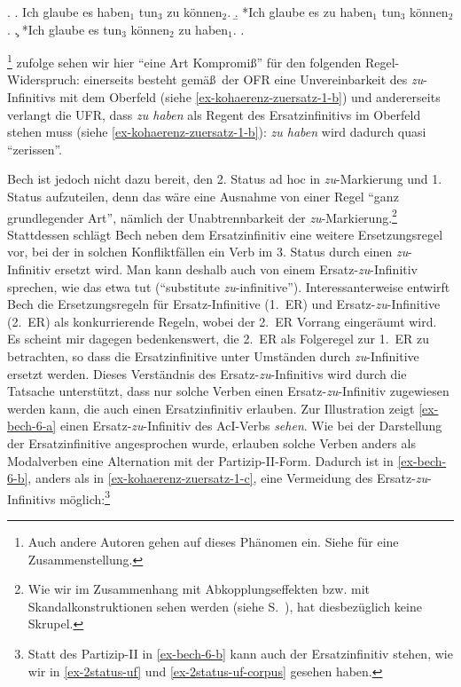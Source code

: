 \ex. 
\a. Ich glaube es haben$_1$ tun$_3$ zu können$_2$. \label{ex-kohaerenz-zuersatz-1}
\b. *Ich glaube es zu haben$_1$ tun$_3$ können$_2$. \label{ex-kohaerenz-zuersatz-1-b}
\c. *Ich glaube es tun$_3$ können$_2$ zu haben$_1$. \label{ex-kohaerenz-zuersatz-1-c}
\z. \citep[\S 14]{Bech:63}

\cite{Bech:63}\footnote{Auch andere Autoren gehen auf dieses Phänomen ein. Siehe \citet[70]{Meurers:99} für eine Zusammenstellung.} zufolge sehen wir hier "`eine Art Kompromi\ss "' für den folgenden Regel-Wider\-spruch: einerseits besteht gemä\ss\ der OFR eine Unvereinbarkeit des \emph{zu}-Infinitivs mit dem Oberfeld (siehe \ref{ex-kohaerenz-zuersatz-1-b}) und andererseits verlangt die UFR, dass {\it zu haben} als Regent des Ersatzinfinitivs im Oberfeld stehen muss (siehe \ref{ex-kohaerenz-zuersatz-1-b}): {\it zu haben} wird dadurch quasi "`zerissen"'. 

Bech ist jedoch nicht dazu bereit, den 2. Status ad hoc in {\it zu}-Markierung und 1. Status aufzuteilen, denn das wäre eine Ausnahme von einer Regel "`ganz grundlegender Art"', nämlich der Unabtrennbarkeit der {\it zu}-Markierung.\footnote{Wie wir im Zusammenhang mit Abkopplungseffekten bzw. mit Skandalkonstruktionen sehen werden (siehe S.~\pageref{sec-skandal}), hat \cite{Vogel:09} diesbezüglich keine Skrupel.} Stattdessen schlägt Bech neben dem Ersatzinfinitiv eine weitere Ersetzungsregel vor, bei der in solchen Konfliktfällen ein Verb im 3. Status durch einen \emph{zu}-Infinitiv ersetzt wird. Man kann deshalb auch von einem Ersatz-\emph{zu}-Infinitiv sprechen, wie das etwa \citet[70ff]{Meurers:99} tut ("`substitute \emph{zu}-infinitive"'). Interessanterweise entwirft Bech die Ersetzungsregeln für Ersatz-Infinitive (1.~ER) und Ersatz-\emph{zu}-Infinitive (2.~ER) als konkurrierende Regeln, wobei der 2.~ER Vorrang eingeräumt wird. Es scheint  mir dagegen bedenkenswert, die 2.~ER als Folgeregel zur 1.~ER zu betrachten, so dass die Ersatzinfinitive unter Umständen durch \emph{zu}-Infinitive ersetzt werden. Dieses Verständnis des Ersatz-\emph{zu}-Infinitivs wird durch die Tatsache unterstützt, dass nur solche Verben einen Ersatz-\emph{zu}-Infinitiv zugewiesen werden kann, die auch einen Ersatzinfinitiv erlauben. Zur Illustration zeigt \ref{ex-bech-6-a} einen Ersatz-\emph{zu}-Infinitiv des AcI-Verbs {\it sehen}. Wie bei der Darstellung der Ersatzinfinitive angesprochen wurde, erlauben solche Verben anders als Modalverben eine Alternation mit der Partizip-II-Form. Dadurch ist in \ref{ex-bech-6-b}, anders als in \ref{ex-kohaerenz-zuersatz-1-c}, eine Vermeidung des Ersatz-\emph{zu}-Infinitivs möglich:\footnote{Statt des Partizip-II in \ref{ex-bech-6-b} kann auch der Ersatzinfinitiv stehen, wie wir in \ref{ex-2status-uf} und \ref{ex-2status-uf-corpus} gesehen haben.}

